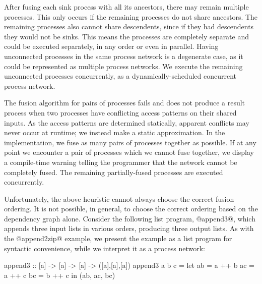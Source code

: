 After fusing each sink process with all its ancestors, there may remain multiple processes.
This only occurs if the remaining processes do not share ancestors.
The remaining processes also cannot share descendents, since if they had descendents they would not be sinks.
This means the processes are completely separate and could be executed separately, in any order or even in parallel.
Having unconnected processes in the same process network is a degenerate case, as it could be represented as multiple process networks.
We execute the remaining unconnected processes concurrently, as a dynamically-scheduled concurrent process network.

The fusion algorithm for pairs of processes fails and does not produce a result process when two processes have conflicting access patterns on their shared inputs.
As the access patterns are determined statically, apparent conflicts may never occur at runtime; we instead make a static approximation.
In the implementation, we fuse as many pairs of processes together as possible.
If at any point we encounter a pair of processes which we cannot fuse together, we display a compile-time warning telling the programmer that the network cannot be completely fused.
The remaining partially-fused processes are executed concurrently.

Unfortunately, the above heuristic cannot always choose the correct fusion ordering.
It is not possible, in general, to choose the correct ordering based on the dependency graph alone.
Consider the following list program, @append3@, which appends three input lists in various orders, producing three output lists.
As with the @append2zip@ example, we present the example as a list program for syntactic convenience, while we interpret it as a process network:

\begin{haskell}
append3 :: [a] -> [a] -> [a] -> ([a],[a],[a])
append3 a b c =
  let ab = a ++ b
      ac = a ++ c
      bc = b ++ c
  in  (ab, ac, bc)
\end{haskell}

